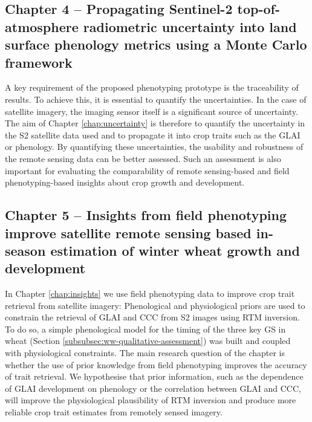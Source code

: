 \subsection*{Chapter 4 -- Propagating Sentinel-2 top-of-atmosphere radiometric uncertainty into land surface phenology metrics using a Monte Carlo framework}
A key requirement of the proposed phenotyping prototype is the traceability of results. To achieve this, it is essential to quantify the uncertainties. In the case of satellite imagery, the imaging sensor itself is a significant source of uncertainty. The aim of Chapter \ref{chap:uncertainty} is therefore to quantify the uncertainty in the \gls{S2} satellite data used and to propagate it into crop traits such as the \gls{GLAI} or phenology. By quantifying these uncertainties, the usability and robustness of the remote sensing data can be better assessed. Such an assessment is also important for evaluating the comparability of remote sensing-based and field phenotyping-based insights about crop growth and development.

\subsection*{Chapter 5 -- Insights from field phenotyping improve satellite remote sensing based in-season estimation of winter wheat growth and development}
In Chapter \ref{chap:insights} we use field phenotyping data to improve crop trait retrieval from satellite imagery: Phenological and physiological priors are used to constrain the retrieval of \gls{GLAI} and \gls{CCC} from \gls{S2} images using \gls{RTM} inversion. To do so, a simple phenological model for the timing of the three key \gls{GS} in wheat (Section \ref{subsubsec:ww-qualitative-assessment}) was built and coupled with physiological constraints. The main research question of the chapter is whether the use of prior knowledge from field phenotyping improves the accuracy of trait retrieval. We hypothesise that prior information, such as the dependence of \gls{GLAI} development on phenology or the correlation between \gls{GLAI} and \gls{CCC}, will improve the physiological plausibility of \gls{RTM} inversion and produce more reliable crop trait estimates from remotely sensed imagery.


